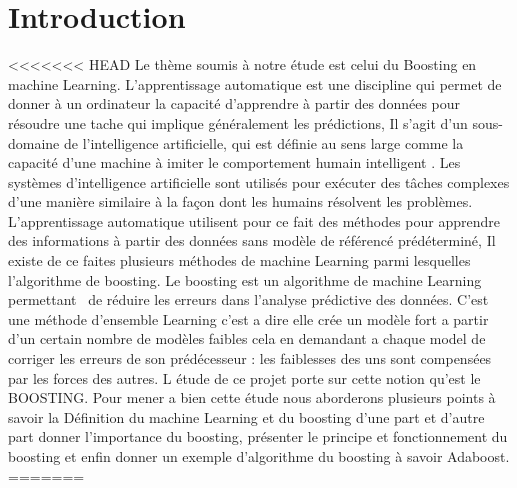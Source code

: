 \documentclass[french,a4paper,12pt]{article}
\begin{document}
 \begin{center}
 \tableofcontents
 \end{center}
\newpage



\section{Introduction}
<<<<<<< HEAD
\quad Le thème soumis à notre étude est celui du Boosting en machine Learning. L’apprentissage automatique est une discipline qui permet de donner à un ordinateur la capacité d’apprendre à partir des données pour résoudre une tache qui implique généralement les prédictions, Il s’agit d’un sous-domaine de l'intelligence artificielle, qui est définie au sens large comme la capacité d'une machine à imiter le comportement humain intelligent \citep{kubat}. Les systèmes d'intelligence artificielle sont utilisés pour exécuter des tâches complexes d'une manière similaire à la façon dont les humains résolvent les problèmes. L'apprentissage automatique utilisent pour ce fait des méthodes pour apprendre des informations à partir des données sans modèle de référencé prédéterminé, Il existe de ce faites plusieurs méthodes de machine Learning parmi lesquelles l’algorithme de boosting. Le boosting est un algorithme de machine Learning permettant \ de réduire les erreurs dans l’analyse prédictive des données. C’est une méthode d’ensemble Learning c’est a dire elle crée un modèle fort a partir d’un certain nombre de modèles faibles cela en demandant a chaque model de corriger les erreurs de son prédécesseur : les faiblesses des uns sont compensées par les forces des autres. L étude de ce projet porte sur cette notion qu’est le BOOSTING. Pour mener a bien cette étude nous aborderons plusieurs points à savoir la Définition du machine Learning et du boosting  d'une part et d'autre part donner l’importance du boosting, présenter le principe et fonctionnement du boosting et enfin donner  un exemple d’algorithme du boosting à savoir Adaboost. 
=======
\end{document}
